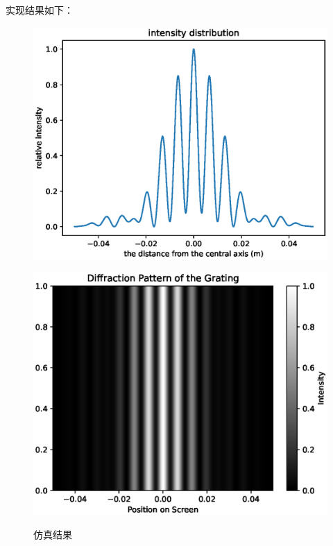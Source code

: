 \documentclass[UTF8]{ctexart}
\begin{document}
    实现结果如下：
    \begin{figure}[h]
        \centering
        \begin{minipage}[b]{0.4\textwidth}
            \centering
            \includegraphics[height=0.28 \textheight]{problem4_e(ii)_1}
            \label{fig:figure4.5.2.1}
        \end{minipage}
        \hfill
        \begin{minipage}[t]{0.4\textwidth}
            \centering
            \includegraphics[height=0.32\textheight]{problem4_e(ii)_2}
            \label{fig:figure4.5.2.2}
        \end{minipage}
        \caption{仿真结果}
    \end{figure}
\end{document}
